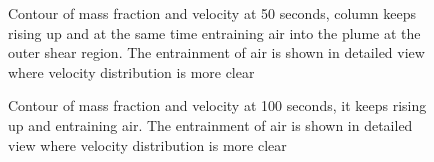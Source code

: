 \documentclass[10pt,a4paper]{article}
\begin{document}
\begin{figure}
\center
{
\hfill
{}
\hfill
{}
\caption{Contour of mass fraction and velocity at 50 seconds, column keeps rising up and at the same time entraining air into the plume at the outer shear region. The entrainment of air is shown in detailed view where velocity distribution is more clear}
\label{fig:strong_plume_t50}
}
\end{figure}

\begin{figure}
\center
{
\hfill
{}
\hfill
{}
\caption{Contour of mass fraction and velocity at 100 seconds, it keeps rising up and entraining air. The entrainment of air is shown in detailed view where velocity distribution is more clear}
\label{fig:strong_plume_t100}
}
\end{figure}
\end{document}
